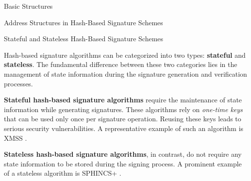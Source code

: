 \documentclass[version=preprint]{iacrcc}
\begin{document}
\begin{section}{Basic Structures}{\label{sec1}}
\begin{subsection}{Address Structures in Hash-Based Signature Schemes}
\end{subsection}

\begin{subsection}{Stateful and Stateless Hash-Based Signature Schemes}

    Hash-based signature algorithms can be categorized into two types: \textbf{stateful} and \textbf{stateless}. The fundamental difference between these two categories lies in the management of state information during the signature generation and verification processes.

\textbf{Stateful hash-based signature algorithms} require the maintenance of state information while generating signatures. These algorithms rely on \textit{one-time keys} that can be used only once per signature operation. Reusing these keys leads to serious security vulnerabilities. A representative example of such an algorithm is XMSS \cite{huelsing2018rfc}.

\textbf{Stateless hash-based signature algorithms}, in contrast, do not require any state information to be stored during the signing process. A prominent example of a stateless algorithm is SPHINCS+ \cite{bernstein2019sphincs+}.
    
\end{subsection}

\end{section}
\end{document}
